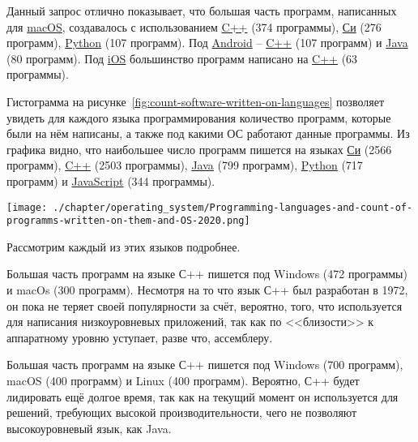 Данный запрос отлично показывает, что большая часть программ, написанных для \href{https://www.wikidata.org/wiki/Q14116}{macOS}, создавалось с использованием \href{https://www.wikidata.org/wiki/Q2407}{C++} (374 программы), \href{https://www.wikidata.org/wiki/Q15777}{Си} (276 программ), \href{https://www.wikidata.org/wiki/Q28865}{Python} (107 программ).
Под \href{https://www.wikidata.org/wiki/Q94}{Android} -- \href{https://www.wikidata.org/wiki/Q2407}{C++} (107 программ) и \href{https://www.wikidata.org/wiki/Q251}{Java} (80 программ).
Под \href{https://www.wikidata.org/wiki/Q48493}{iOS} большинство программ написано на \href{https://www.wikidata.org/wiki/Q2407}{C++} (63 программы).

Гистограмма на рисунке~\ref{fig:count-software-written-on-languages} позволяет увидеть для каждого языка программирования количество программ, которые были на нём написаны, а также под какими ОС работают данные программы. Из графика видно, что наибольшее число программ пишется на языках \href{https://www.wikidata.org/wiki/Q15777}{Си} (2566 программ), \href{https://www.wikidata.org/wiki/Q2407}{C++} (2503 программы), \href{https://www.wikidata.org/wiki/Q251}{Java} (799 программ), \href{https://www.wikidata.org/wiki/Q28865}{Python} (717 программ) и \href{https://www.wikidata.org/wiki/Q2005}{JavaScript} (344 программы).

\begin{figure*}[h!]
	\texttt{[image: ./chapter/operating\_system/Programming-languages-and-count-of-programms-written-on-them-and-OS-2020.png]}
	\caption{Языки программирования и количество ОС, под которыми работают программы, написанные на этих языках, 2020 год.}
	\label{fig:count-software-written-on-languages}
\end{figure*}

Рассмотрим каждый из этих языков подробнее.

Большая часть программ на языке С++ пишется под Windows (472 программы) и macOs (300 программ). Несмотря на то что язык С++ был разработан в 1972, он пока не теряет своей популярности за счёт, вероятно, того, что используется для написания низкоуровневых приложений, так как по <<близости>> к аппаратному уровню уступает, разве что, ассемблеру.

Большая часть программ на языке С++ пишется под Windows (700 программ), macOS (400 программ) и Linux (400 программ). Вероятно, С++ будет лидировать ещё долгое время, так как на текущий момент он используется для решений, требующих высокой производительности, чего не позволяют высокоуровневый язык, как Java\cite{Cilyurik2014LangPerformance}.

